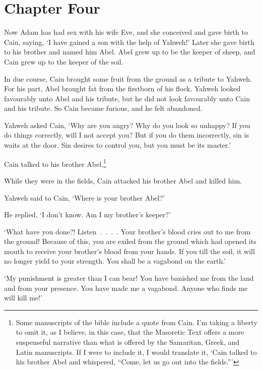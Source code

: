 \chapter*{Chapter Four}

Now Adam has had sex with his wife Eve,
and she conceived and gave birth to Cain, saying,
`I have gained a son with the help of Yahweh!'
Later she gave birth to his brother
and named him Abel.
Abel grew up to be the keeper of sheep, 
and Cain grew up to the keeper of the soil.

In due course, 
Cain brought some fruit from the ground 
as a tribute to Yahweh. 
For his part,
Abel brought fat from 
the firstborn of his flock.
Yahweh looked favourably unto Abel and his tribute,
but he did not look favourably unto Cain and his tribute.
So Cain became furious, and he felt abandoned.

Yahweh asked Cain,
`Why are you angry?
Why do you look so unhappy?
If you do things correctly,
will I not accept you?
But if you do them incorrectly,
sin is waits at the door.
Sin desires to control you,
but you must be its master.'

Cain talked to his brother Abel.\footnote{
    Some manuscripts of the bible include a quote from Cain.
    I'm taking a liberty to omit it, as I believe, in this case,
    that the Masoretic Text offers a more suspenseful narrative
    than what is offered by 
    the Samaritan, Greek, and Latin manuscripts.
    If I were to include it, I would translate it, 
    `Cain talked to his brother Abel and whispered, 
    ``Come, let us go out into the fields.'''
}

\secsep

\noindent While they were in the fields, 
Cain attacked his brother Abel and killed him.

Yahweh said to Cain,
`Where is your brother Abel?'

He replied,
`I don't know. 
Am I my brother's keeper?'

`What have you done?!
Listen~.~.~.~. 
Your brother's blood 
cries out to me from the ground!
Because of this, you are exiled from the ground 
which had opened its mouth
to receive your brother's blood 
from your hands.
If you till the soil,
it will no longer yield to your strength.
You shall be a vagabond on the earth.'

`My punishment is greater than I can bear!
You have banished me from the land
and from your presence. 
You have made me a vagabond.
Anyone who finds me will kill me!'

